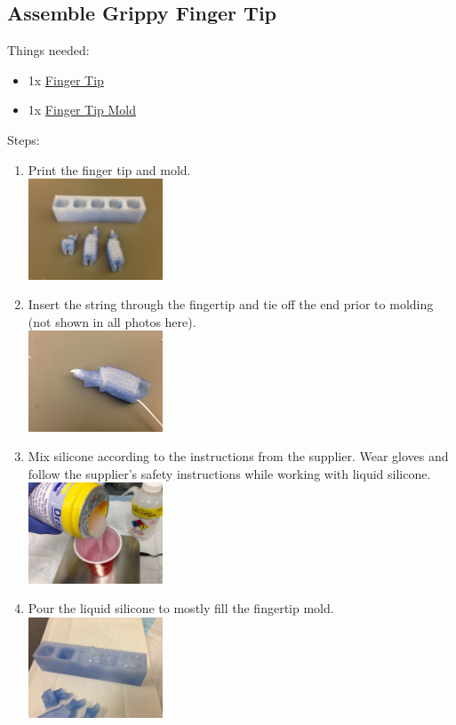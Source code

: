 \documentclass[11pt]{article}
\begin{document}
\subsection{Assemble Grippy Finger Tip}
Things needed:
\begin{itemize}
\item 1x \hyperlink{thing_finger\_tip}{Finger Tip}
\item 1x \hyperlink{thing_finger\_tip\_mold}{Finger Tip Mold}
\end{itemize}
Steps:
\begin{enumerate}
\item Print the finger tip and mold.\\ \includegraphics[width=4cm]{images/pad_casting/Printed parts.jpg}
\item Insert the string through the fingertip and tie off the end prior to molding (not shown in all photos here).\\ \includegraphics[width=4cm]{images/pad_casting/Fingertip with string.jpg}
\item Mix silicone according to the instructions from the supplier. Wear gloves and follow the supplier's safety instructions while working with liquid silicone.\\ \includegraphics[width=4cm]{images/pad_casting/Pouring part A.jpg}
\item Pour the liquid silicone to mostly fill the fingertip mold.\\ \includegraphics[width=4cm]{images/pad_casting/Poured into mold.jpg}

\end{enumerate}
\end{document}
